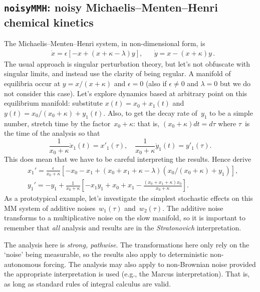 \subsection{\texttt{noisyMMH}: noisy Michaelis--Menten--Henri chemical kinetics} 
\label{nonautoTwo}
\def\b#1{\color{blue}{}#1\color{black}{}}
\def\dash#1{#1'}%


The Michaelis--Menten--Henri system, in non-dimensional form, is
\begin{align*}
&\dot x=\epsilon[-x+(x+\kappa-\lambda)y],
&&\dot y=x-(x+\kappa)y\,.
\end{align*}
The usual approach is singular perturbation theory, but let's not obfuscate with singular limits, and instead use the clarity of being regular.
A manifold of equilibria occur at \(y=x/(x+\kappa)\) and \(\epsilon=0\)  (also if \(\epsilon\neq 0\) and \(\lambda=0\) but we do not consider this case).
Let's explore dynamics based at arbitrary point on this equilibrium manifold:
substitute \(x(t)=x_0+x_1(t)\) and \(y(t)=x_0/(x_0+\kappa)+y_1(t)\).
Also, to get the decay rate of~\(y_1\) to be a simple number, stretch time by the factor~\(x_0+\kappa\): that is, \((x_0+\kappa)dt=d\tau\) where \(\tau\)~is the time of the analysis so that
\begin{equation*}
\frac1{x_0+\kappa}\dot x_1(t)=x'_1(\tau),\quad
\frac1{x_0+\kappa}\dot y_1(t)=y'_1(\tau).
\end{equation*}
This does mean that we have to be careful interpreting the results.  Hence derive
\begin{align*}&
x_1'=\frac\epsilon{x_0+\kappa}\left[
-x_0-x_1+(x_0+x_1+\kappa-\lambda)(x_0/(x_0+\kappa)+y_1)
\right],
\\&
y_1'=-y_1+\frac1{x_0+\kappa}\left[
-x_1y_1+x_0+x_1-\frac{(x_0+x_1+\kappa)x_0}{x_0+\kappa}\right].
\end{align*}
As a prototypical example, let's investigate the simplest
stochastic effects on this MM system of additive noises~\(w_1(\tau)\) and~\(w_2(\tau)\). The
additive noise transforms to a multiplicative noise on
the slow manifold, so it is important to remember that
\emph{all} analysis and results are in the
\emph{Stratonovich} interpretation.

The analysis here is \emph{strong, pathwise}.
The transformations here only rely on the `noise' being
measurable, so the results also apply to deterministic
non-autonomous forcing. The analysis may also apply to
non-Brownian noise provided the appropriate interpretation
is used (e.g., the Marcus interpretation).  That is, as long
as standard rules of integral calculus are valid.

